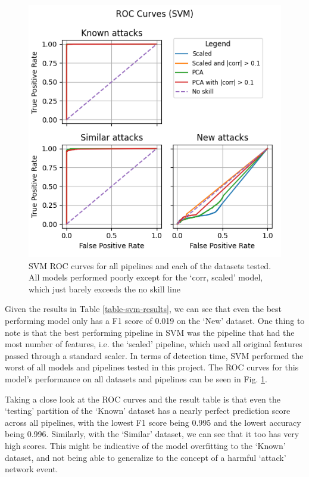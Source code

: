 \documentclass[journal]{IEEEtran}
\begin{document}
\begin{figure}
    \centering
    \includegraphics[width=\linewidth]{figures/SVM_roc_all_small.png}
    \caption{SVM ROC curves for all pipelines and each of the datasets tested. All models performed poorly except for the `corr, scaled' model, which just barely exceeds the no skill line}
    \label{fig:svm-roc}
\end{figure}

Given the results in Table \ref{table-svm-results}, we can see that even the best performing model only has a F1 score of 0.019 on the `New' dataset. One thing to note is that the best performing pipeline in SVM was the pipeline that had the most number of features, i.e. the `scaled' pipeline, which used all original features passed through a standard scaler. In terms of detection time, SVM performed the worst of all models and pipelines tested in this project. The ROC curves for this model's performance on all datasets and pipelines can be seen in Fig. \ref{fig:svm-roc}. 

Taking a close look at the ROC curves and the result table is that even the `testing' partition of the `Known' dataset has a nearly perfect prediction score across all pipelines, with the lowest F1 score being 0.995 and the lowest accuracy being 0.996. Similarly, with the `Similar' dataset, we can see that it too has very high scores. This might be indicative of the model overfitting to the `Known' dataset, and not being able to generalize to the concept of a harmful `attack' network event. 
\end{document}
